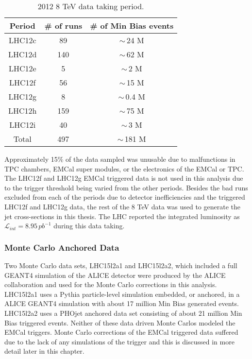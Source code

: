 \begin{table}[hb]
\label{tab:RunSummary}
\begin{center}
\caption{2012 8 TeV data taking period.}
\begin{tabular}[b]{|c|c|c|}
	\hline
	Period & \# of runs & \# of Min Bias events \\ \hline
	LHC12c & 89 & $\sim \,$24 M \\ \hline
	LHC12d & 140 & $\sim \,$62 M \\ \hline
	LHC12e & 5 & $\sim \,$2 M \\ \hline
	LHC12f & 56 & $\sim \,$15 M \\ \hline
	LHC12g & 8 & $\sim \,$0.4 M \\ \hline
	LHC12h & 159 & $\sim \,$75 M \\ \hline
	LHC12i & 40 & $\sim \,$3 M \\ \hline
	Total & 497 & $\sim \,$181 M \\ \hline

\end{tabular}
\end{center}

\end{table}

Approximately 15\% of the data sampled was unusable due to malfunctions in TPC chambers, EMCal super modules, or the electronics of the EMCal or TPC.  The LHC12f  and LHC12g EMCal triggered data is not used in this analysis due to the trigger threshold being varied from the other periods.  Besides the bad runs excluded from each of the periods due to detector inefficiencies and the triggered LHC12f and LHC12g data, the rest of the 8 TeV data was used to generate the jet cross-sections in this thesis.  The LHC reported the integrated luminosity as $\mathscr{L}_{int} = 8.95 \, pb^{-1}$ during this data taking\cite{ALICE-PUBLIC-2017-002}.

\subsubsection{Monte Carlo Anchored Data}
Two Monte Carlo data sets, LHC15l2a1 and LHC15l2a2, which included a full GEANT4 simulation of the ALICE detector were produced by the ALICE collaboration and used for the Monte Carlo corrections in this analysis.   LHC15l2a1 uses a Pythia particle-level simulation embedded, or anchored, in a ALICE GEANT4 simulation with about 17 million Min Bias generated events.  LHC15l2a2 uses a PHOjet anchored data set consisting of about 21 million Min Bias triggered events.  Neither of these data driven Monte Carlos modeled the EMCal triggers.  Monte Carlo corrections of the EMCal triggered data suffered due to the lack of any simulations of the trigger and this is discussed in more detail later in this chapter.

